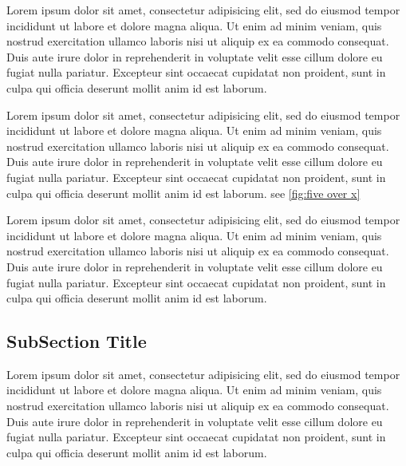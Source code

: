         Lorem ipsum dolor sit amet, consectetur adipisicing elit, sed do eiusmod tempor incididunt ut labore et dolore magna aliqua. Ut enim ad minim veniam, quis nostrud exercitation ullamco laboris nisi ut aliquip ex ea commodo consequat. Duis aute irure dolor in reprehenderit in voluptate velit esse cillum dolore eu fugiat nulla pariatur. Excepteur sint occaecat cupidatat non proident, sunt in culpa qui officia deserunt mollit anim id est laborum.

        Lorem ipsum dolor sit amet, consectetur adipisicing elit, sed do eiusmod tempor incididunt ut labore et dolore magna aliqua. Ut enim ad minim veniam, quis nostrud exercitation ullamco laboris nisi ut aliquip ex ea commodo consequat. Duis aute irure dolor in reprehenderit in voluptate velit esse cillum dolore eu fugiat nulla pariatur. Excepteur sint occaecat cupidatat non proident, sunt in culpa qui officia deserunt mollit anim id est laborum.
        see \ref{fig:five over x}

        Lorem ipsum dolor sit amet, consectetur adipisicing elit, sed do eiusmod tempor incididunt ut labore et dolore magna aliqua. Ut enim ad minim veniam, quis nostrud exercitation ullamco laboris nisi ut aliquip ex ea commodo consequat. Duis aute irure dolor in reprehenderit in voluptate velit esse cillum dolore eu fugiat nulla pariatur. Excepteur sint occaecat cupidatat non proident, sunt in culpa qui officia deserunt mollit anim id est laborum.

        \subsection{SubSection Title}
        Lorem ipsum dolor sit amet, consectetur adipisicing elit, sed do eiusmod tempor incididunt ut labore et dolore magna aliqua. Ut enim ad minim veniam, quis nostrud exercitation ullamco laboris nisi ut aliquip ex ea commodo consequat. Duis aute irure dolor in reprehenderit in voluptate velit esse cillum dolore eu fugiat nulla pariatur. Excepteur sint occaecat cupidatat non proident, sunt in culpa qui officia deserunt mollit anim id est laborum.
